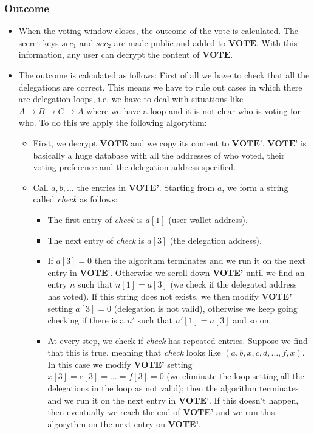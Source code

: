 \documentclass[submission, copyright,creativecommons,sharealike,noncommercial]{eptcs}
\begin{document}
		\subsubsection{Outcome}
			\begin{itemize}
				\item When the voting window closes, the outcome of the vote is calculated. The secret keys $sec_1$ and $sec_2$ are made public and added to $\textbf{VOTE}$. With this information, any user can decrypt the content of $\textbf{VOTE}$.
				
				\item The outcome is calculated as follows: First of all we have to check that all the delegations are correct. This means we have to rule out cases in which there are delegation loops, i.e. we have to deal with situations like $A \to B \to C \to A$ where we have a loop and it is not clear who is voting for who. To do this we apply the following algorythm:
				
				\begin{itemize}
					\item First, we decrypt $\textbf{VOTE}$ and we copy its content to $\textbf{VOTE'}$. $\textbf{VOTE'}$ is basically a huge database with all the addresses of who voted, their voting preference and the delegation address specified. 
					
					\item Call $a,b,\dots$ the entries in \textbf{VOTE'}. Starting from $a$, we form a string called \emph{check} as follows:
					\begin{itemize}
						\item The first entry of \emph{check} is $a[1]$ (user wallet address).
				
						\item The next entry of \emph{check} is $a[3]$ (the delegation address).
				
						\item If $a[3]=0$ then the algorithm terminates and we run it on the next entry in $\textbf{VOTE'}$. Otherwise we scroll down \textbf{VOTE'} until we find an entry $n$ such that $n[1] = a[3]$ (we check if the delegated address has voted). If this string does not exists, we then modify \textbf{VOTE'} setting $a[3] = 0$ (delegation is not valid), otherwise we keep going checking if there is a $n'$ such that $n'[1] = a[3]$ and so on.
						
						\item At every step, we check if \emph{check} has repeated entries. Suppose we find that this is true, meaning that \emph{check} looks like $(a,b,x,c,d, \dots, f, x)$. In this case we modify \textbf{VOTE'} setting $x[3] = c[3] = \dots = f[3] = 0$ (we eliminate the loop setting all the delegations in the loop as not valid); then the algorithm terminates and we run it on the next entry in $\textbf{VOTE'}$. If this doesn't happen, then eventually we reach the end of \textbf{VOTE'} and we run this algorythm on the next entry on \textbf{VOTE'}.
					\end{itemize}
				

\end{itemize}
\end{itemize}
\end{document}
